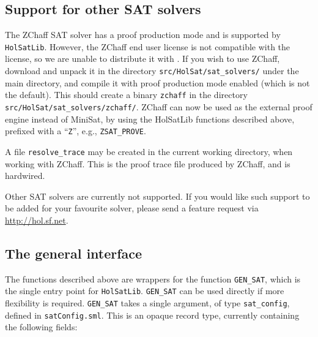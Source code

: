 \subsection{Support for other SAT solvers}\label{subsec:hs_zchaff}

The ZChaff SAT solver has a proof production mode and is supported by {\tt{HolSatLib}}. However, the ZChaff end user license is not compatible with the \HOL{} license, so we are unable to distribute it with \HOL{}. If you wish to use ZChaff, download and unpack it in the directory {\tt src/HolSat/sat\_solvers/} under the main \HOL{} directory, and compile it with proof production mode enabled (which is not the default). This should create a binary {\tt zchaff} in the directory {\tt src/HolSat/sat\_solvers/zchaff/}. ZChaff can now be used as the external proof engine instead of MiniSat, by using the HolSatLib functions described above, prefixed with a ``{\tt Z}'', e.g., {\tt ZSAT\_PROVE}.

A file \texttt{resolve\_trace} may be created in the current working directory, when working with ZChaff. This is the proof trace file produced by ZChaff, and is hardwired.

Other SAT solvers are currently not supported. If you would like such support to be added for your favourite solver, please send a feature request via \url{http://hol.sf.net}.

\subsection{The general interface}

The functions described above are wrappers for the function \texttt{GEN\_SAT}, which is the single entry point for {\tt{HolSatLib}}. \texttt{GEN\_SAT} can be used directly if more flexibility is required. \texttt{GEN\_SAT} takes a single argument, of type \texttt{sat\_config}, defined in \texttt{satConfig.sml}. This is an opaque record type, currently containing the following fields:

